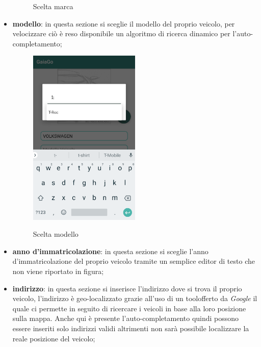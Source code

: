\begin{itemize}
\begin{figure}[H]
	\caption{Scelta marca}
	\label{marca}
\end{figure}
\pagebreak
\item \textbf{modello}: in questa sezione si sceglie il modello del proprio veicolo, per velocizzare ciò è reso disponibile un algoritmo di ricerca dinamico per l'auto-completamento;
 \begin{figure}[H] 
	\centering 
	\includegraphics[width=0.5\textwidth]{res/images/modello_auto.png}\\
	\caption{Scelta modello}
	\label{modello}
\end{figure}
\item \textbf{anno d'immatricolazione}: in questa sezione si sceglie l'anno d'immatricolazione del proprio veicolo tramite un semplice editor di testo che non viene riportato in figura;
\pagebreak
\item \textbf{indirizzo}: in questa sezione si inserisce l'indirizzo dove si trova il proprio veicolo, l'indirizzo è geo-localizzato grazie all'uso di un tool\glosp offerto da \textit{Google} il quale ci permette in seguito di ricercare i veicoli in base alla loro posizione sulla mappa. Anche qui è presente l'auto-completamento quindi possono essere inseriti solo indirizzi validi altrimenti non sarà possibile localizzare la reale posizione del veicolo;
 \begin{figure}[H] 
	\centering 

\end{figure}
\end{itemize}
